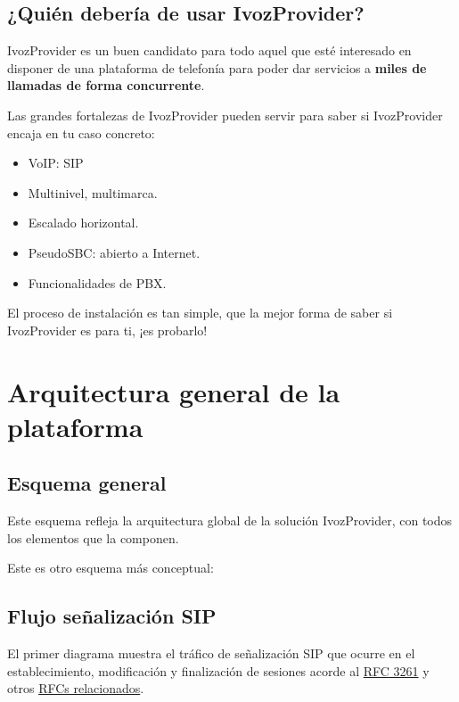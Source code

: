 \documentclass[letterpaper,10pt,spanish]{sphinxmanual}
\begin{document}
\section{¿Quién debería de usar IvozProvider?}
\label{intro/use_cases::doc}\label{intro/use_cases:who-should-use-ivozprovider}
IvozProvider es un buen candidato para todo aquel que esté interesado en disponer de una plataforma de telefonía para poder dar servicios a  \textbf{miles de llamadas de forma concurrente}.

Las grandes fortalezas de IvozProvider pueden servir para saber si IvozProvider encaja en tu caso concreto:
\begin{itemize}
\item {} 
VoIP: SIP

\item {} 
Multinivel, multimarca.

\item {} 
Escalado horizontal.

\item {} 
PseudoSBC: abierto a Internet.

\item {} 
Funcionalidades de PBX.

\end{itemize}

El proceso de instalación es tan simple, que la mejor forma de saber si IvozProvider es para ti, ¡es probarlo!


\chapter{Arquitectura general de la plataforma}
\label{architecture/index:platform-general-architecture}\label{architecture/index::doc}\label{architecture/index:architecture}

\section{Esquema general}
\label{architecture/index:general-diagram}
Este esquema refleja la arquitectura global de la solución IvozProvider, con todos los elementos que la componen.

\noindent{}

Este es otro esquema más conceptual:

\noindent{}


\section{Flujo señalización SIP}
\label{architecture/index:sip-signalling-flow}\label{architecture/index:signallingflow}
El primer diagrama muestra el tráfico de señalización SIP que ocurre en el establecimiento, modificación y finalización de sesiones acorde al  \href{https://tools.ietf.org/html/rfc3261}{RFC 3261} y otros \href{https://www.packetizer.com/ipmc/sip/standards.html}{RFCs relacionados}.
\end{document}
